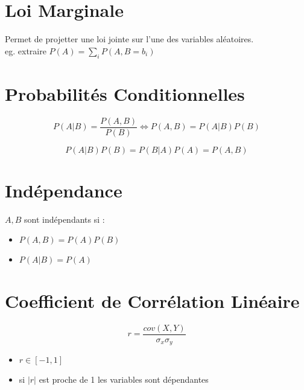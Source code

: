 \documentclass{article}
\begin{document}
\section{Loi Marginale}
Permet de projetter une loi jointe sur l'une des variables aléatoires.\\
eg. extraire $P(A) = \sum\limits_i P(A, B=b_i)$



\section{Probabilités Conditionnelles}
\begin{equation}
    P(A | B) = \frac{P(A,B)}{P(B)} \iff P(A, B) = P(A | B) P(B)
\end{equation}

\begin{equation}
    P(A | B) P(B) = P(B | A) P(A) = P(A, B)
\end{equation}


\section{Indépendance}
$A, B$ sont indépendants si :
\begin{itemize}
    \item $P(A, B) = P(A)P(B)$
    \item $P(A | B) = P(A)$
\end{itemize}


\section{Coefficient de Corrélation Linéaire}

\begin{equation}
    r = \frac{cov(X, Y)}{\sigma_x\sigma_y}
\end{equation}

\begin{itemize}
    \item $r \in [-1, 1]$
    \item si $|r|$ est proche de 1 les variables sont dépendantes
\end{itemize}
\end{document}
